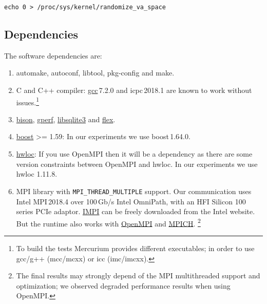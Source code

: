 \documentclass{article}
\newcommand{\code}[1]{\texttt{#1}}
\begin{document}
\begin{lstlisting}
echo 0 > /proc/sys/kernel/randomize_va_space
\end{lstlisting}

\subsection{Dependencies}

The software dependencies are:

\begin{enumerate}
    \item automake, autoconf, libtool, pkg-config and make.

    \item C and C++ compiler:  \href{https://gcc.gnu.org/}{gcc}\,7.2.0
        and icpc\,2018.1 are known to work without
        issues.\footnote{To build the tests Mercurium provides different executables;
        in order to use gcc/g++ (mcc/mcxx) or icc (imc/imcxx).}

    \item \href{https://www.gnu.org/software/bison/}{bison},
        \href{https://www.gnu.org/software/gperf/}{gperf},
        \href{https://sqlite.org/version3.html}{libsqlite3} and
        \href{https://github.com/westes/flex}{flex}.

    \item \href{https://www.boost.org/}{boost} >= 1.59: In our experiments
        we use boost\,1.64.0.

    \item \href{https://www.open-mpi.org/projects/hwloc/}{hwloc}: If you
        use OpenMPI then it will be a dependency as there are some version
        constraints between OpenMPI and hwloc. In our experiments we use
        hwloc 1.11.8.

    \item MPI library with \code{MPI\_THREAD\_MULTIPLE} support. Our communication
        uses Intel MPI\,2018.4 over 100\,Gb/s Intel OmniPath, with an HFI Silicon
        100 series PCIe adaptor.  \href{https://www.intel.com/content/www/us/en/developer/tools/oneapi/mpi-library.html}{IMPI}
        can be freely downloaded from the Intel website.
        But the runtime also works with \href{https://www.open-mpi.org/}{OpenMPI}
        and \href{https://www.mpich.org/}{MPICH}.
        \footnote{The final results may strongly depend of the MPI multithreaded
        support and optimization; we observed degraded performance results
        when using OpenMPI.}


\end{enumerate}
\end{document}
